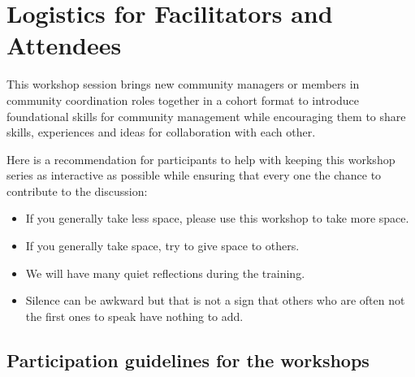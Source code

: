 \documentclass[
  letterpaper,
  DIV=11,
  numbers=noendperiod]{scrreport}
\providecommand{\tightlist}{%
  \setlength{\itemsep}{0pt}\setlength{\parskip}{0pt}}\usepackage{longtable,booktabs,array}
\begin{document}

\hypertarget{logistics-for-facilitators-and-attendees}{%
\chapter{Logistics for Facilitators and
Attendees}\label{logistics-for-facilitators-and-attendees}}

This workshop session brings new community managers or members in
community coordination roles together in a cohort format to introduce
foundational skills for community management while encouraging them to
share skills, experiences and ideas for collaboration with each other.

Here is a recommendation for participants to help with keeping this
workshop series as interactive as possible while ensuring that every one
the chance to contribute to the discussion:

\begin{itemize}
\tightlist
\item
  If you generally take less space, please use this workshop to take
  more space.
\item
  If you generally take space, try to give space to others.
\item
  We will have many quiet reflections during the training.
\item
  Silence can be awkward but that is not a sign that others who are
  often not the first ones to speak have nothing to add.
\end{itemize}

\hypertarget{participation-guidelines-for-the-workshops}{%
\section{Participation guidelines for the
workshops}\label{participation-guidelines-for-the-workshops}}
\end{document}
